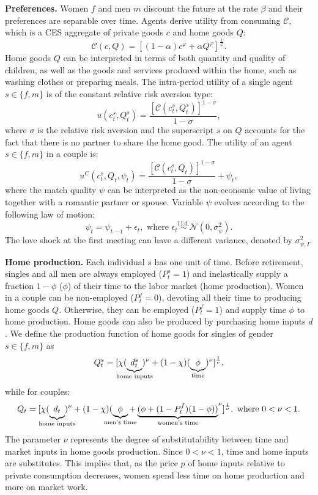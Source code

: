 \documentclass[12pt]{article}
\numberwithin{table}{section}
\begin{document}
\textbf{Preferences.} Women $f$ and men $m$ discount the future at the rate $\beta$ and their preferences are separable over time. Agents derive utility from consuming $\mathcal{C}$, which is a CES aggregate of private goods  $c$ and home goods $Q$:
\[
\mathcal{C}(c,Q) = \left[(1-\alpha) c^\varphi+\alpha Q^\varphi\right]^{\frac{1}{\varphi}}.
\]
Home goods $Q$ can be interpreted in terms of both quantity and quality of children, as well as the goods and services produced within the home, such as washing clothes or preparing meals. The intra-period utility of a single agent $s\in\{f,m\}$ is of the constant relative risk aversion type:
\[u(c^s_t,Q^s_t)=\frac{{[\mathcal{C}(c^s_t,Q^s_t)]}^{1-\sigma}}{1-\sigma},\]
where $\sigma$ is the relative risk aversion and the superscript $s$ on $Q$ accounts for the fact that there is no partner to share the home good. The utility of an agent $s\in\{f,m\}$ in a couple is:
\[u^{C}(c^s_t,Q_t,\psi_t)=\frac{{[\mathcal{C}(c^s_t,Q_t)]}^{1-\sigma}}{1-\sigma}+\psi_t,\]
where the match quality $\psi$ can be interpreted as the non-economic value of living together with a romantic partner or spouse. Variable $\psi$ evolves according to the following law of motion:
\[\psi_t=\psi_{t-1}+\epsilon_t,\text{ where }\epsilon_t \overset{\text{i.i.d.}}{\sim}\mathcal{N}(0,\sigma^2_{\psi}). \]
The love shock at the first meeting can have a different variance, denoted by $\sigma^2_{\psi,I}$. 

\textbf{Home production.} Each individual $s$ has one unit of time. Before retirement, singles and all men are always employed ($P^s_t=1$) and inelastically supply a fraction  $1-\phi$ ($\phi$) of their time to the labor market (home production).  Women in a couple can be non-employed ($P^f_t=0$), devoting all their time to producing home goods $Q$. Otherwise, they can be employed ($P^f_t=1$) and supply time $\phi$ to home production. Home goods can also be produced by purchasing home inputs $d$. We define the production function of home goods for singles of gender $s\in\{f,m\}$ as
\begin{equation}\label{eq:pfunctions}
	Q^s_t=[\chi(\underbrace{d^s_t}_{\text{\makebox[0pt]{home inputs}}})^\nu+(1-\chi)(\underbrace{\phi}_{\text{\makebox[0pt]{time}}})^\nu ]^{\frac{1}{\nu}},
\end{equation}
while for couples:
\begin{equation}\label{eq:pfunction}
	Q_t=[\chi(\underbrace{\strut d_t}_{\text{\makebox[0pt]{home inputs}}})^\nu+(1-\chi) {(\underbrace{\phi}_{\text{\makebox[0pt]{men's time}}}+\underbrace{(\phi+(1-{{\color{orange}}P^f_t})(1-\phi))}_{\text{women's time}}}^\nu ]^{\frac{1}{\nu}}, \text{ where }0<\nu<1.
\end{equation}
The parameter $\nu$ represents the degree of substitutability between time and market inputs in home goods production. Since $0<\nu<1$, time and home inputs are substitutes. This implies that, as the price $p$ of home inputs relative to private consumption decreases, women spend less time on home production and more on market work. %
\end{document}
